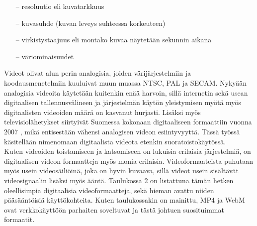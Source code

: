 \documentclass[finnish, 12pt, a4paper, elec, utf8, a-1b, online]{aaltothesis}
\begin{document}
\begin{itemize}
  \item[--] resoluutio eli kuvatarkkuus
  \item[--] kuvasuhde (kuvan leveys suhteessa korkeuteen)
  \item[--] virkistystaajuus eli montako kuvaa näytetään sekunnin aikana
  \item[--] väriominaisuudet
\end{itemize}

\noindent Videot olivat alun perin analogisia, joiden värijärjestelmiin ja koodausmenetelmiin kuuluivat muun muassa NTSC, PAL ja SECAM. Nykyään analogisia videoita käytetään kuitenkin enää harvoin, sillä internetin sekä usean digitaalisen tallennusvälineen ja järjestelmän käytön yleistymisen myötä myös digitaalisten videoiden määrä on kasvanut hurjasti. Lisäksi myös televisiolähetykset siirtyivät Suomessa kokonaan digitaaliseen formaattiin vuonna 2007 \cite{Digita}, mikä entisestään vähensi analogisen videon esiintyvyyttä. Tässä työssä käsitellään nimenomaan digitaalista videota etenkin suoratoistokäytössä. \\

\noindent Kuten videoiden toistamiseen ja katsomiseen on lukuisia erilaisia järjestelmiä, on digitaalisen videon formaatteja myös monia erilaisia. Videoformaateista puhutaan myös usein videosäiliöinä, joka on hyvin kuvaava, sillä videot usein sisältävät videosignaalin lisäksi myös ääntä. Taulukossa 2 on listattuna tämän hetken oleellisimpia digitaalisia videoformaatteja, sekä hieman avattu niiden pääsääntöisiä käyttökohteita. Kuten taulukossakin on mainittu, MP4 ja WebM ovat verkkokäyttöön parhaiten soveltuvat ja tästä johtuen suosituimmat formaatit. \\
\end{document}
